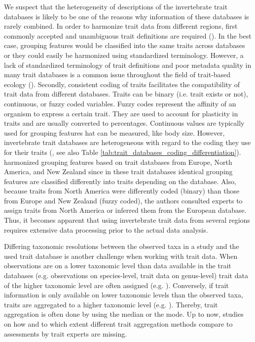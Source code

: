 \documentclass{article}
\begin{document}
We suspect that the heterogeneity of descriptions of the invertebrate trait databases is likely to be one of the reasons why information of these databases is rarely combined. In order to harmonize trait data from different regions, first commonly accepted and unambiguous trait definitions are required (\cite{schneider_towards_2019}). In the best case, grouping features would be classified into the same traits across databases or they could easily be harmonized using standardized terminology. However, a lack of standardized terminology of trait definitions and poor metadata quality in many trait databases is a common issue throughout the field of trait-based ecology (\cite{baird_toward_2011, schneider_towards_2019}). Secondly, consistent coding of traits facilitates the compatibility of trait data from different databases. Traits can be binary (i.e. trait exists or not), continuous, or fuzzy coded variables. Fuzzy codes represent the affinity of an organism to express a certain trait. They are used to account for plasticity in traits and are usually converted to percentages. Continuous values are typically used for grouping features hat can be measured, like body size. However, invertebrate trait databases are heterogeneous with regard to the coding they use for their traits (\cite{culp_incorporating_2011}, see also Table \ref{tab:trait_databases_coding_differentiation}). \cite{brown_functional_2018} harmonized grouping features based on trait databases from Europe, North America, and New Zealand since in these trait databases identical grouping features are classified differently into traits depending on the database. Also, because traits from North America were differently coded (binary) than those from Europe and New Zealand (fuzzy coded), the authors consulted experts to assign traits from North America or inferred them from the European database. 
Thus, it becomes apparent that using invertebrate trait data from several regions requires extensive data processing prior to the actual data analysis.

Differing taxonomic resolutions between the observed taxa in a study and the used trait database is another challenge when working with trait data. When observations are on a lower taxonomic level than data available in the trait databases (e.g. observations on species-level, trait data on genus-level) trait data of the higher taxonomic level are often assigned (e.g. \cite{szocs_effects_2014}). %
Conversely, if trait information is only available on lower taxonomic levels than the observed taxa, traits are aggregated to a higher taxonomic level (e.g. \cite{poff_functional_2006, szocs_effects_2014, piliere_a._f._h._importance_2016}). Thereby, trait aggregation is often done by using the median or the mode. Up to now, studies on how and to which extent different trait aggregation methods compare to assessments by trait experts are missing.
\end{document}

